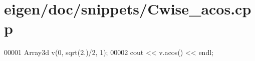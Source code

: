 \hypertarget{eigen_2doc_2snippets_2_cwise__acos_8cpp_source}{}\section{eigen/doc/snippets/\+Cwise\+\_\+acos.cpp}
\label{eigen_2doc_2snippets_2_cwise__acos_8cpp_source}

\begin{DoxyCode}
00001 Array3d v(0, sqrt(2.)/2, 1);
00002 cout << v.acos() << endl;
\end{DoxyCode}
